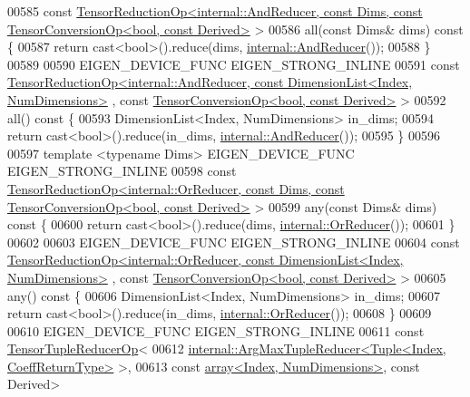 \begin{DoxyCode}
00585     \textcolor{keyword}{const} 
      \hyperlink{class_eigen_1_1_tensor_reduction_op}{TensorReductionOp<internal::AndReducer, const Dims, const TensorConversionOp<bool, const Derived>}
       >
00586     all(\textcolor{keyword}{const} Dims& dims)\textcolor{keyword}{ const }\{
00587       \textcolor{keywordflow}{return} cast<bool>().reduce(dims, \hyperlink{struct_eigen_1_1internal_1_1_and_reducer}{internal::AndReducer}());
00588     \}
00589 
00590     EIGEN\_DEVICE\_FUNC EIGEN\_STRONG\_INLINE
00591     \textcolor{keyword}{const} 
      \hyperlink{class_eigen_1_1_tensor_reduction_op}{TensorReductionOp<internal::AndReducer, const DimensionList<Index, NumDimensions>}
      , \textcolor{keyword}{const} \hyperlink{class_eigen_1_1_tensor_conversion_op}{TensorConversionOp<bool, const Derived>} >
00592     all()\textcolor{keyword}{ const }\{
00593       DimensionList<Index, NumDimensions> in\_dims;
00594       \textcolor{keywordflow}{return} cast<bool>().reduce(in\_dims, \hyperlink{struct_eigen_1_1internal_1_1_and_reducer}{internal::AndReducer}());
00595     \}
00596 
00597     \textcolor{keyword}{template} <\textcolor{keyword}{typename} Dims> EIGEN\_DEVICE\_FUNC EIGEN\_STRONG\_INLINE
00598     \textcolor{keyword}{const} 
      \hyperlink{class_eigen_1_1_tensor_reduction_op}{TensorReductionOp<internal::OrReducer, const Dims, const TensorConversionOp<bool, const Derived>}
       >
00599     any(\textcolor{keyword}{const} Dims& dims)\textcolor{keyword}{ const }\{
00600       \textcolor{keywordflow}{return} cast<bool>().reduce(dims, \hyperlink{struct_eigen_1_1internal_1_1_or_reducer}{internal::OrReducer}());
00601     \}
00602 
00603     EIGEN\_DEVICE\_FUNC EIGEN\_STRONG\_INLINE
00604     \textcolor{keyword}{const} 
      \hyperlink{class_eigen_1_1_tensor_reduction_op}{TensorReductionOp<internal::OrReducer, const DimensionList<Index, NumDimensions>}
      , \textcolor{keyword}{const} \hyperlink{class_eigen_1_1_tensor_conversion_op}{TensorConversionOp<bool, const Derived>} >
00605     any()\textcolor{keyword}{ const }\{
00606       DimensionList<Index, NumDimensions> in\_dims;
00607       \textcolor{keywordflow}{return} cast<bool>().reduce(in\_dims, \hyperlink{struct_eigen_1_1internal_1_1_or_reducer}{internal::OrReducer}());
00608     \}
00609 
00610    EIGEN\_DEVICE\_FUNC EIGEN\_STRONG\_INLINE
00611     \textcolor{keyword}{const} \hyperlink{class_eigen_1_1_tensor_tuple_reducer_op}{TensorTupleReducerOp}<
00612       \hyperlink{struct_eigen_1_1internal_1_1_arg_max_tuple_reducer}{internal::ArgMaxTupleReducer<Tuple<Index, CoeffReturnType>}
       >,
00613       \textcolor{keyword}{const} \hyperlink{class_eigen_1_1array}{array<Index, NumDimensions>}, \textcolor{keyword}{const} Derived>

\end{DoxyCode}
